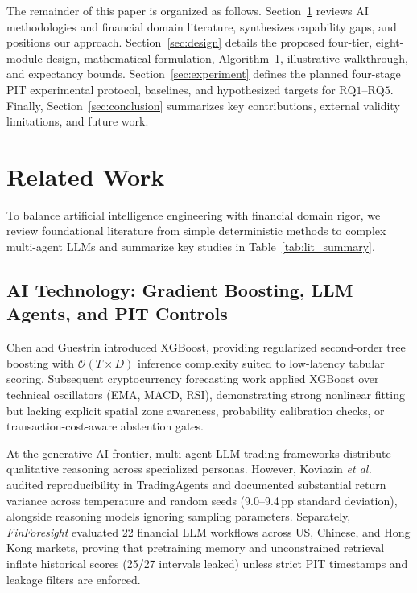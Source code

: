 \documentclass[conference]{IEEEtran}
\begin{document}
The remainder of this paper is organized as follows. Section~\ref{sec:related} reviews AI methodologies and financial domain literature, synthesizes capability gaps, and positions our approach. Section~\ref{sec:design} details the proposed four-tier, eight-module design, mathematical formulation, Algorithm~1, illustrative walkthrough, and expectancy bounds. Section~\ref{sec:experiment} defines the planned four-stage PIT experimental protocol, baselines, and hypothesized targets for $\mathrm{RQ1}$--$\mathrm{RQ5}$. Finally, Section~\ref{sec:conclusion} summarizes key contributions, external validity limitations, and future work.

\section{Related Work}
\label{sec:related}

To balance artificial intelligence engineering with financial domain rigor, we review foundational literature from simple deterministic methods to complex multi-agent LLMs and summarize key studies in Table~\ref{tab:lit_summary}.

\subsection{AI Technology: Gradient Boosting, LLM Agents, and PIT Controls}
Chen and Guestrin \cite{chen2016} introduced XGBoost, providing regularized second-order tree boosting with $\mathcal{O}(T \times D)$ inference complexity suited to low-latency tabular scoring. Subsequent cryptocurrency forecasting work \cite{arxiv2407} applied XGBoost over technical oscillators (EMA, MACD, RSI), demonstrating strong nonlinear fitting but lacking explicit spatial zone awareness, probability calibration checks, or transaction-cost-aware abstention gates.

At the generative AI frontier, multi-agent LLM trading frameworks distribute qualitative reasoning across specialized personas. However, Koviazin \textit{et al.} \cite{koviazin2026} audited reproducibility in TradingAgents and documented substantial return variance across temperature and random seeds (9.0--9.4\,pp standard deviation), alongside reasoning models ignoring sampling parameters. Separately, \textit{FinForesight} \cite{finforesight2026} evaluated 22 financial LLM workflows across US, Chinese, and Hong Kong markets, proving that pretraining memory and unconstrained retrieval inflate historical scores (25/27 intervals leaked) unless strict PIT timestamps and leakage filters are enforced.
\end{document}
